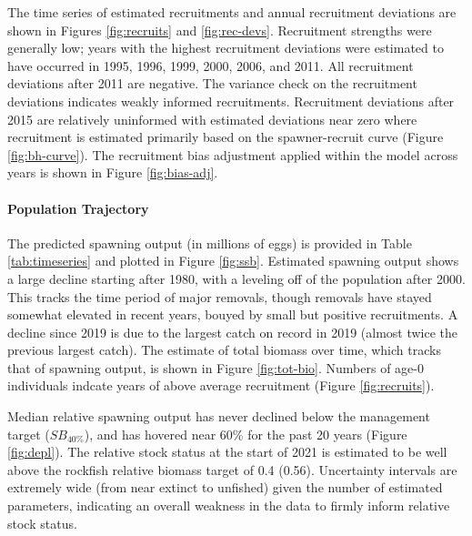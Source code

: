 \documentclass[11pt,
  english,
  a4paper,
]{article}
\begin{document}
The time series of estimated recruitments and annual recruitment deviations are shown in Figures \ref{fig:recruits} and \ref{fig:rec-devs}. Recruitment strengths were generally low; years with the highest recruitment deviations were estimated to have occurred in 1995, 1996, 1999, 2000, 2006, and 2011. All recruitment deviations after 2011 are negative. The variance check on the recruitment deviations indicates weakly informed recruitments. Recruitment deviations after 2015 are relatively uninformed with estimated deviations near zero where recruitment is estimated primarily based on the spawner-recruit curve (Figure \ref{fig:bh-curve}). The recruitment bias adjustment applied within the model across years is shown in Figure \ref{fig:bias-adj}.

\leavevmode\tagmcend\tagstructend\par


\hypertarget{population-trajectory}{%
\paragraph{Population Trajectory}\label{population-trajectory}}

\leavevmode\tagmcend\tagstructend


The predicted spawning output (in millions of eggs) is provided in Table \ref{tab:timeseries} and plotted in Figure \ref{fig:ssb}. Estimated spawning output shows a large decline starting after 1980, with a leveling off of the population after 2000. This tracks the time period of major removals, though removals have stayed somewhat elevated in recent years, bouyed by small but positive recruitments. A decline since 2019 is due to the largest catch on record in 2019 (almost twice the previous largest catch). The estimate of total biomass over time, which tracks that of spawning output, is shown in Figure \ref{fig:tot-bio}. Numbers of age-0 individuals indcate years of above average recruitment (Figure \ref{fig:recruits}).

\leavevmode\tagmcend\tagstructend\par


Median relative spawning output has never declined below the management target ({\(SB_{40\%}\)\leavevmode\tagmcend\tagstructend}), and has hovered near 60\% for the past 20 years (Figure \ref{fig:depl}). The relative stock status at the start of 2021 is estimated to be well above the rockfish relative biomass target of 0.4 (0.56). Uncertainty intervals are extremely wide (from near extinct to unfished) given the number of estimated parameters, indicating an overall weakness in the data to firmly inform relative stock status.
\end{document}
